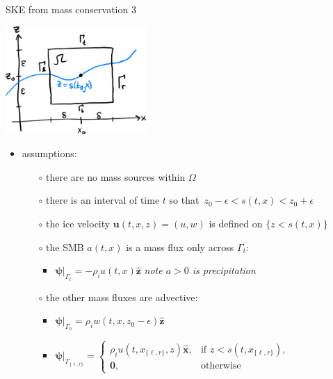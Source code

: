 \documentclass[10pt,dvipsnames]{beamer}
\newcommand{\bu}{\mathbf{u}}
\newcommand{\hbx}{\hat{\mathbf{x}}}
\newcommand{\hbz}{\hat{\mathbf{z}}}
\newcommand{\bpsi}{\bm{\psi}}
\newcommand{\bzero}{\bm{0}}
\newcommand{\eps}{\epsilon}
\newcommand{\rhoi}{\rho_{\text{i}}}
\newcommand{\comm}[1]{{\footnotesize \hfill \emph{#1}}}
\begin{document}
\begin{frame}{SKE from mass conservation 3}
\begin{center}
\includegraphics[width=0.4\textwidth]{skederive.png}
\end{center}

\vspace{-3mm}

\begin{itemize}
\item assumptions:
    \begin{itemize}
    \item[$\circ$] there are no mass sources within $\Omega$
    \item[$\circ$] there is an interval of time $t$ so that \,$z_0-\eps < s(t,x) < z_0 + \eps$
    \item[$\circ$] the ice velocity $\bu(t,x,z)=(u,w)$ is defined on $\{z<s(t,x)\}$
    \item[$\circ$] the SMB $a(t,x)$ is a mass flux only across $\Gamma_t$:
        \begin{itemize}
        \item $\bpsi\big|_{\Gamma_t} = - \rho_i a(t,x) \hbz$  \comm{note $a>0$ is precipitation}
        \end{itemize}
    \item[$\circ$] the other mass fluxes are advective:
        \begin{itemize}
        \item $\bpsi\big|_{\Gamma_b} = \rho_i w(t,x,z_0-\eps) \hbz$
        \item $\bpsi\big|_{\Gamma_{\{\ell,r\}}} = \begin{cases} \rho_i u(t,x_{\{\ell,r\}},z) \hbx, & \text{if } z < s(t,x_{\{\ell,r\}}), \\ \bzero, & \text{otherwise} \end{cases}$
        \end{itemize}
    \end{itemize}
\end{itemize}
\end{frame}
\end{document}
